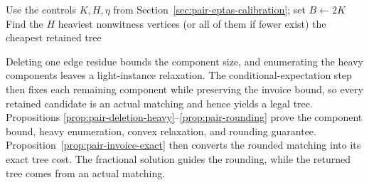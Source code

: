 \begin{algorithm}[H]
\caption{Expected-depth EPTAS for weighted singleton/pair paths and cycles}
\label{alg:pair-eptas}
Use the controls $K,H,\eta$ from
Section~\ref{sec:pair-eptas-calibration}; set $B\gets2K$\;
Find the $H$ heaviest nonwitness vertices (or all of them if fewer exist)\;
\KwRet the cheapest retained tree\;
\end{algorithm}

Deleting one edge residue bounds the component size, and enumerating
the heavy components leaves a light-instance relaxation. The
conditional-expectation step then fixes each remaining component while
preserving the invoice bound, so every retained candidate is an actual
matching and hence yields a legal tree. Propositions
\ref{prop:pair-deletion-heavy}--\ref{prop:pair-rounding} prove the
component bound, heavy enumeration, convex relaxation, and rounding
guarantee. Proposition~\ref{prop:pair-invoice-exact} then converts the
rounded matching into its exact tree cost. The fractional solution
guides the rounding, while the returned tree comes from an actual
matching.
